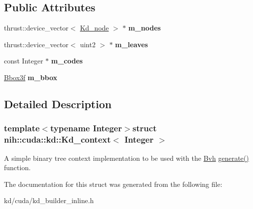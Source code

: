\subsection*{\-Public \-Attributes}
\begin{DoxyCompactItemize}
\item 
\hypertarget{structnih_1_1cuda_1_1kd_1_1_kd__context_a1d4db2176f098648cacdee4e7adb244a}{
thrust\-::device\-\_\-vector$<$ \hyperlink{structnih_1_1_kd__node}{\-Kd\-\_\-node} $>$ $\ast$ {\bfseries m\-\_\-nodes}}
\label{structnih_1_1cuda_1_1kd_1_1_kd__context_a1d4db2176f098648cacdee4e7adb244a}

\item 
\hypertarget{structnih_1_1cuda_1_1kd_1_1_kd__context_ae96715333ddb88a26a386d385854abd1}{
thrust\-::device\-\_\-vector$<$ uint2 $>$ $\ast$ {\bfseries m\-\_\-leaves}}
\label{structnih_1_1cuda_1_1kd_1_1_kd__context_ae96715333ddb88a26a386d385854abd1}

\item 
\hypertarget{structnih_1_1cuda_1_1kd_1_1_kd__context_a32a217fc1c3193b8a64267f9ab7b0ea4}{
const \-Integer $\ast$ {\bfseries m\-\_\-codes}}
\label{structnih_1_1cuda_1_1kd_1_1_kd__context_a32a217fc1c3193b8a64267f9ab7b0ea4}

\item 
\hypertarget{structnih_1_1cuda_1_1kd_1_1_kd__context_aa1bff2df090cba714b96d3c5b572d151}{
\hyperlink{structnih_1_1_bbox}{\-Bbox3f} {\bfseries m\-\_\-bbox}}
\label{structnih_1_1cuda_1_1kd_1_1_kd__context_aa1bff2df090cba714b96d3c5b572d151}

\end{DoxyCompactItemize}


\subsection{\-Detailed \-Description}
\subsubsection*{template$<$typename Integer$>$struct nih\-::cuda\-::kd\-::\-Kd\-\_\-context$<$ Integer $>$}

\-A simple binary tree context implementation to be used with the \hyperlink{structnih_1_1_bvh}{\-Bvh} \hyperlink{group__bintree_gad76a50ae08ab4d525f748a7cbcc0fb6e}{generate()} function. 

\-The documentation for this struct was generated from the following file\-:\begin{DoxyCompactItemize}
\item 
kd/cuda/kd\-\_\-builder\-\_\-inline.\-h\end{DoxyCompactItemize}
